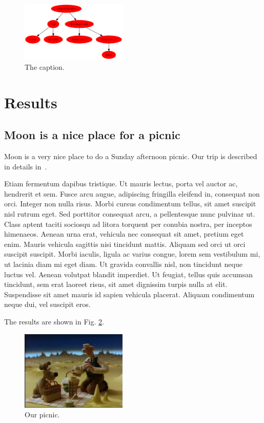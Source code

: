 \documentclass[final,12pt]{article}
\begin{document}
\begin{figure}[h]
\begin{center}
\includegraphics[width=0.45\textwidth]{figures/dirtree.pdf}
\caption{The caption.}\label{fig:spectrum}       %
\end{center}
\end{figure}


\section{Results}
\subsection{Moon is a nice place for a picnic}

Moon is a very nice place to do a Sunday afternoon picnic. Our trip
is described in details in~\cite{trip}.

Etiam fermentum dapibus tristique. Ut mauris lectus, porta vel auctor
ac, hendrerit et sem. Fusce arcu augue, adipiscing fringilla eleifend
in, consequat non orci. Integer non nulla risus. Morbi cursus
condimentum tellus, sit amet suscipit nisl rutrum eget. Sed porttitor
consequat arcu, a pellentesque nunc pulvinar ut. Class aptent taciti
sociosqu ad litora torquent per conubia nostra, per inceptos
himenaeos. Aenean urna erat, vehicula nec consequat sit amet, pretium
eget enim. Mauris vehicula sagittis nisi tincidunt mattis. Aliquam sed
orci ut orci suscipit suscipit. Morbi iaculis, ligula ac varius
congue, lorem sem vestibulum mi, ut lacinia diam mi eget diam. Ut
gravida convallis nisl, non tincidunt neque luctus vel. Aenean
volutpat blandit imperdiet. Ut feugiat, tellus quis accumsan
tincidunt, sem erat laoreet risus, sit amet dignissim turpis nulla at
elit. Suspendisse sit amet mauris id sapien vehicula placerat. Aliquam
condimentum neque dui, vel suscipit eros.

The results are shown in Fig. \ref{fig:picnic}.

\begin{figure}[h]
\begin{center}
\includegraphics[width=0.45\textwidth]{figures/A_Grand_Day_Out.png}
\caption{Our picnic.}\label{fig:picnic}       %
\end{center}
\end{figure}
\end{document}
